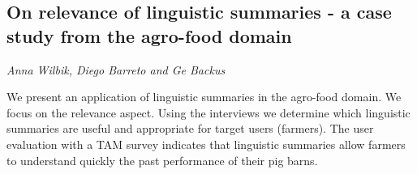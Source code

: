 \documentclass[../booklet.tex]{subfiles}
\begin{document}
\subsection[On relevance of linguistic summaries - a case study from the agro-food domain. {\it Anna Wilbik, Diego Barreto and Ge Backus}]{On relevance of linguistic summaries - a case study from the agro-food domain}
  

\begin{center}
  {\it Anna Wilbik, Diego Barreto and Ge Backus}
\end{center}



We present an application of linguistic summaries in the agro-food domain. We focus on the relevance aspect. Using the interviews we  determine which linguistic summaries are useful and appropriate for target users (farmers). The user evaluation with a TAM survey indicates that linguistic summaries allow farmers to understand quickly the past performance of their pig barns.

\end{document}

